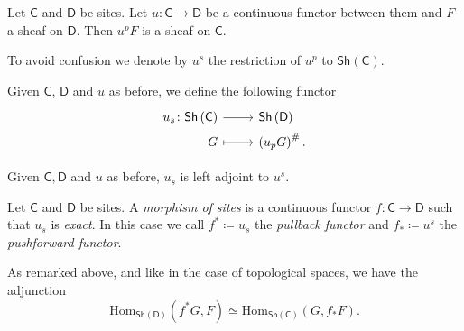 \documentclass[../Main]{subfiles}
\begin{document}
\begin{lem}
	Let $\mathsf{C}$ and $\mathsf{D}$ be sites.
	Let $u\colon \mathsf{C} \to \mathsf{D}$ be a continuous functor between them
	and $F$ a sheaf on $\mathsf{D}$.
	Then $u^pF$ is a sheaf on $\mathsf{C}$.
\end{lem}


\begin{ntt}[]
	To avoid confusion we denote by $u^s$ the restriction of $u^p$ to $\mathsf{Sh}(\mathsf{C})$.
\end{ntt}


\begin{defn}[]
	Given $\mathsf{C}$, $\mathsf{D}$ and $u$ as before, we define the following
	functor
	\begin{equation*}
	\begin{tikzcd}[row sep = 0ex
		,/tikz/column 1/.append style={anchor=base east}
		,/tikz/column 2/.append style={anchor=base west}]
		u_s\colon \mathsf{Sh}\left(\mathsf{C}\right) \arrow[r, "", rightarrow] &
		\mathsf{Sh}\left(\mathsf{D}\right) \\
		G \arrow[r, "", mapsto] & \left( u_p G \right)^\#
	.\end{tikzcd}
	\end{equation*} 
\end{defn}


\begin{rem}
	Given $\mathsf{C}, \mathsf{D}$ and $u$ as before,
	$u_s$ is left adjoint to $u^s$.
\end{rem}


\begin{defn}
	Let $\mathsf{C}$ and $\mathsf{D}$ be sites.
	A {\em morphism of sites} is a continuous functor $f\colon \mathsf{C} \to \mathsf{D}$
	such that $u_s$ is {\em exact}. 
	In this case we call $f^* \coloneqq u_s$ the {\em pullback functor}
	and $f_* \coloneqq u^s$ the {\em pushforward functor}.
\end{defn}

\begin{rem}[]
	As remarked above, and like in the case of topological spaces, we have the adjunction
	\begin{equation*}
		\mathrm{Hom}_{\mathsf{Sh}(\mathsf{D})} \left( f^* G, F \right) \simeq
		\mathrm{Hom}_{\mathsf{Sh}(\mathsf{C})} \left( G, f_* F \right) 
	.\end{equation*}
\end{rem}
\end{document}
